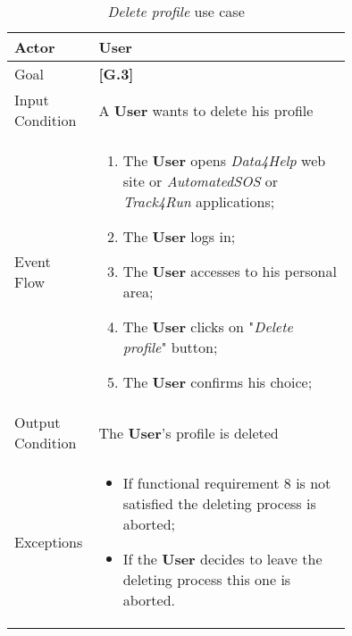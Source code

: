 \begin{center}
\begin{table}
\begin{tabular}{ | l | p{0.75\linewidth} | }
  \hline
    Actor & \textbf{User} \\ \hline
    Goal & \textbf{[G.3]} \\ \hline
    Input Condition & A \textbf{User} wants to delete his profile\\ \hline
    Event Flow & \begin{minipage}[t]{0.7\textwidth}
      \begin{enumerate}
        \item The \textbf{User} opens \textit{Data4Help} web site or \textit{AutomatedSOS} or \textit{Track4Run} applications;
        \item The \textbf{User} logs in;
        \item The \textbf{User} accesses to his personal area;
        \item The \textbf{User} clicks on "\textit{Delete profile}" button;
        \item The \textbf{User} confirms his choice;
      \end{enumerate}
    \smallskip
  \end{minipage} \\ \hline
  Output Condition & The \textbf{User}'s  profile is deleted\\ \hline
  Exceptions & \begin{minipage}[t]{0.7\textwidth}
    \begin{itemize}
      \smallskip
      \item If functional requirement 8 is not satisfied the deleting process is aborted;
      \item If the \textbf{User} decides to leave the deleting process this one is aborted.
    \end{itemize}
    \smallskip
  \end{minipage}  \\ \hline
\end{tabular}
\caption{\textit{Delete profile} use case}
\label{table:deleteProfileTable}
\end{table}
\end{center}
